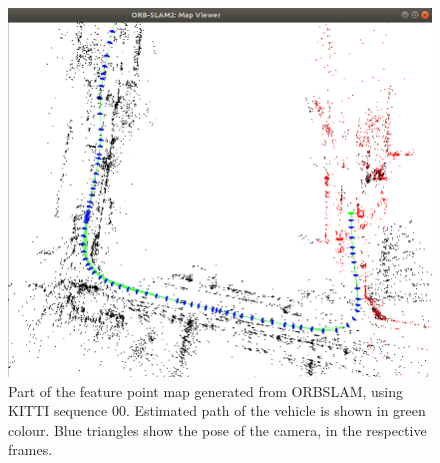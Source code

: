 \begin{figure}[h]
	\centering
	\includegraphics[width=\textwidth]{figs/path_pred.png}
	\vspace{-0.5cm}
	\caption[Map of feature points]{Part of the feature point map generated from \gls{ORBSLAM}, using \gls{KITTI} sequence 00. Estimated path of the vehicle is shown in green colour. Blue triangles show the pose of the camera, in the respective frames.}
	\label{fig:ra:point_map}
	\vspace{0.5cm}
\end{figure}

